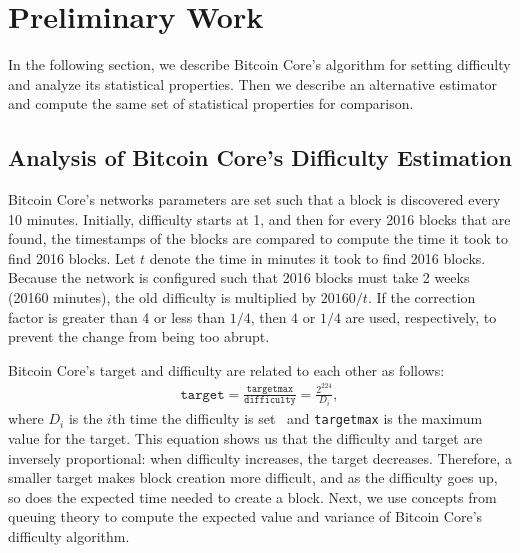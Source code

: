 \section{Preliminary Work}
In the following section, we describe Bitcoin Core's algorithm for setting difficulty and analyze its statistical properties. Then we describe an alternative estimator and compute the same set of statistical properties for comparison.
\subsection{Analysis of Bitcoin Core's Difficulty Estimation}
 Bitcoin Core's networks parameters are set such that a block is discovered every 10 minutes. Initially, difficulty starts at 1, and then for every 2016 blocks that are found, the timestamps of the blocks are compared to compute the time it took to find 2016 blocks. Let $t$ denote the time in minutes it took to find 2016 blocks. Because the network is configured such that 2016 blocks must take 2 weeks (20160 minutes), the old difficulty is multiplied by $20160 / t$. If the correction factor is greater than $4$ or less than $1/4$, then $4$ or $1/4$ are used, respectively, to prevent the change from being too abrupt.
\par \noindent Bitcoin Core's target and difficulty are related to each other as follows:
\begin{align}
\texttt{target} = \frac{\texttt{targetmax}}{\texttt{difficulty}} = \frac{2^{224}}{{D_i}},
\end{align} 
where $D_i$ is the $i$th time the difficulty is set~\cite{bitcoin:difficulty} and \texttt{targetmax} is the maximum value for the target. This equation shows us that the difficulty and target are inversely proportional: when difficulty increases, the target decreases. Therefore, a smaller target makes block creation more difficult, and as the difficulty goes up, so does the expected time needed to create a block. Next, we use concepts from queuing theory to compute the expected value and variance of Bitcoin Core's difficulty algorithm.

